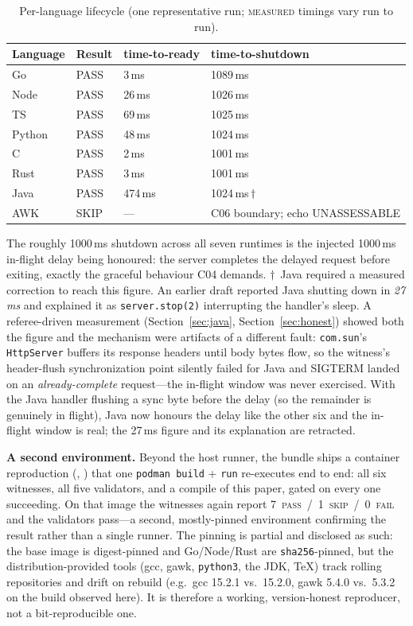 \documentclass[11pt,letterpaper]{article}
\newcommand{\measured}{\textsc{measured}}
\begin{document}
\begin{table}[htbp]
\centering
\small
\begin{tabularx}{\linewidth}{@{}lllX@{}}
\toprule
Language & Result & time-to-ready & time-to-shutdown \\
\midrule
Go     & PASS & 3\,ms   & 1089\,ms \\
Node   & PASS & 26\,ms  & 1026\,ms \\
TS     & PASS & 69\,ms  & 1025\,ms \\
Python & PASS & 48\,ms  & 1024\,ms \\
C      & PASS & 2\,ms   & 1001\,ms \\
Rust   & PASS & 3\,ms   & 1001\,ms \\
Java   & PASS & 474\,ms & 1024\,ms\,$\dagger$ \\
AWK    & SKIP & ---     & C06 boundary; echo UNASSESSABLE \\
\bottomrule
\end{tabularx}
\caption{Per-language lifecycle (one representative run; \measured{}
timings vary run to run).}
\label{tab:lifecycle}
\end{table}

The roughly 1000\,ms shutdown across all seven runtimes is the injected
1000\,ms in-flight delay being honoured: the server completes the delayed
request before exiting, exactly the graceful behaviour C04 demands.
$\dagger$~Java required a measured correction to reach this figure. An
earlier draft reported Java shutting down in \emph{27\,ms} and explained it
as \texttt{server.stop(2)} interrupting the handler's sleep. A
referee-driven measurement (Section~\ref{sec:java}, Section~\ref{sec:honest})
showed both the figure and the mechanism were artifacts of a different fault:
\texttt{com.sun}'s \texttt{HttpServer} buffers its response headers until body
bytes flow, so the witness's header-flush synchronization point silently
failed for Java and SIGTERM landed on an \emph{already-complete} request---the
in-flight window was never exercised. With the Java handler flushing a sync
byte before the delay (so the remainder is genuinely in flight), Java now
honours the delay like the other six and the in-flight window is real; the
27\,ms figure and its explanation are retracted.

\textbf{A second environment.} Beyond the host runner, the bundle ships a
container reproduction (, ) that one
\texttt{podman build} + \texttt{run} re-executes end to end: all six witnesses,
all five validators, and a compile of this paper, gated on every one succeeding.
On that image the witnesses again report 7~\textsc{pass}~/~1~\textsc{skip}~/~0~\textsc{fail}
and the validators pass---a second, mostly-pinned environment confirming the
result rather than a single runner. The pinning is partial and disclosed as
such: the base image is digest-pinned and Go/Node/Rust are \texttt{sha256}-pinned,
but the distribution-provided tools (gcc, gawk, \texttt{python3}, the JDK, \TeX)
track rolling repositories and drift on rebuild (e.g.\ gcc 15.2.1 vs.\ 15.2.0,
gawk 5.4.0 vs.\ 5.3.2 on the build observed here). It is therefore a working,
version-honest reproducer, not a bit-reproducible one.
\end{document}
